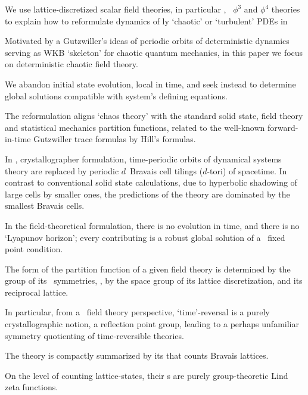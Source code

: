 

We use lattice-discretized
scalar field theories, in particular \catlatt, \Henon\
{$\phi^3$} and {$\phi^4$} theories
to explain how to reformulate dynamics of {\spt}ly `chaotic' or
`turbulent' PDEs in

Motivated by a Gutzwiller's ideas of periodic orbits of
deterministic dynamics serving as WKB
`skeleton' for chaotic quantum mechanics, in this paper we
focus on deterministic chaotic field theory.

We abandon initial state evolution, local in time, and seek instead to
determine global solutions compatible with system's defining equations.

The reformulation aligns `chaos theory' with the standard solid state,
field theory and statistical mechanics partition functions, related to
the well-known for\-ward-in-time Gutzwiller trace formulas by Hill's
formulas.

In \spt, crystallographer formulation, time-periodic orbits of
dynamical systems theory are replaced by periodic $d$\dmn\ {Bravais cell}
tilings ($d$-tori) of spacetime. In contrast to conventional
solid state calculations, due to hyperbolic shadowing of large
cells by smaller ones, the predictions of the theory are dominated by
the smallest Bravais cells.


In the field-theoretical formulation, there is no evolution in time, and
there is no `Lyapunov horizon'; every contributing {\em \lattstate} is a
robust global solution of a \spt\ fixed point condition.

The form of the partition function of a
given field theory is determined by the group of its \spt\ symmetries, \ie,
by the space group of its lattice discretization,  and its reciprocal
lattice.

In particular, from a \spt\ field theory perspective, `time'-reversal is
a purely crystallographic notion, a reflection point group, leading to a
perhaps unfamiliar symmetry quotienting of time-reversible theories.

The theory is compactly summarized by its {\tzeta}
that counts Bravais lattices.

On the level of counting lattice-states, their {\tzeta}s are purely
group-theoretic Lind zeta functions.

